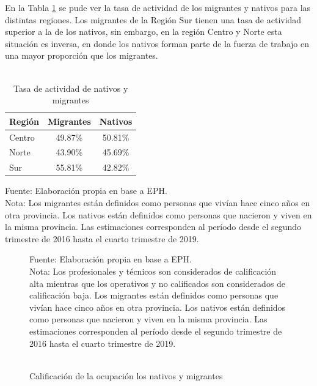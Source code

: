 \documentclass[12pt,a4paper]{article}
\begin{document}
En la Tabla \ref{cuadro:tasaactiv_mig} se pude ver la tasa de actividad de  los migrantes y nativos para las distintas regiones. Los migrantes de la Región Sur tienen una tasa de actividad superior a la de los nativos, sin embargo, en la región Centro y Norte esta situación es inversa, en donde los nativos forman parte de la fuerza de trabajo en una mayor proporción que los migrantes.
\begin{table}[htbp!]
\centering
\caption{\\Tasa de actividad de nativos y migrantes} 
\begin{tabular}{lcc}
  \hline
 Región & Migrantes & Nativos \\ 
  \hline
Centro & 49.87\% & 50.81\% \\ 
Norte & 43.90\% & 45.69\% \\ 
Sur & 55.81\%  & 42.82\% \\
   \hline
\end{tabular}
\label{cuadro:tasaactiv_mig}
\begin{flushleft}
\begin{scriptsize}
Fuente: Elaboración propia en base a EPH.\\
Nota: Los migrantes están definidos como personas que vivían hace cinco años en otra provincia. Los nativos están definidos como personas que nacieron y viven en la misma provincia. Las estimaciones corresponden al período desde el segundo trimestre de 2016 hasta el cuarto trimestre de 2019.\\
\end{scriptsize}
\end{flushleft}
\end{table}

\begin{figure}[htbp!]
\begin{center}
\caption{\\Calificación de la ocupación los nativos y migrantes}
\label{figure:calif_mig}
 
\end{center}
\begin{flushleft}
\begin{scriptsize}
Fuente: Elaboración propia en base a EPH.\\
Nota: Los profesionales y técnicos son considerados de calificación alta mientras que los operativos y no calificados son considerados de calificación baja. Los migrantes están definidos como personas que vivían hace cinco años en otra provincia. Los nativos están definidos como personas que nacieron y viven en la misma provincia. Las estimaciones corresponden al período desde el segundo trimestre de 2016 hasta el cuarto trimestre de 2019.\\
\end{scriptsize}
\end{flushleft}
\end{figure}
\end{document}
